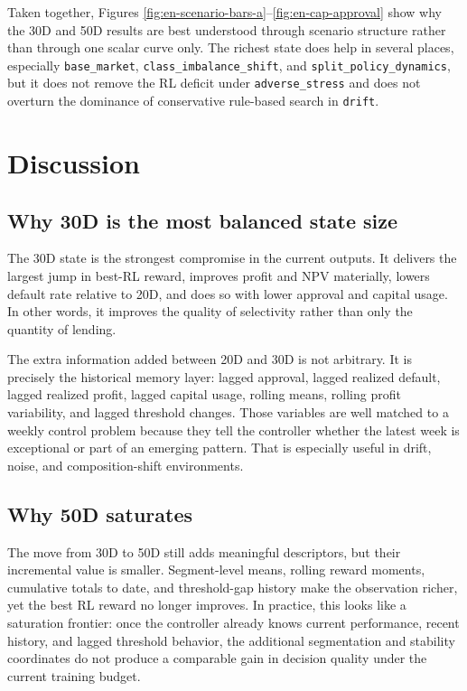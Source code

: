 \documentclass[12pt,a4paper]{article}
\begin{document}
Taken together, Figures \ref{fig:en-scenario-bars-a}--\ref{fig:en-cap-approval} show why the 30D and 50D results are best understood through scenario structure rather than through one scalar curve only. The richest state does help in several places, especially \texttt{base\_market}, \texttt{class\_imbalance\_shift}, and \texttt{split\_policy\_dynamics}, but it does not remove the RL deficit under \texttt{adverse\_stress} and does not overturn the dominance of conservative rule-based search in \texttt{drift}.

\section{Discussion}

\subsection{Why 30D is the most balanced state size}

The 30D state is the strongest compromise in the current outputs. It delivers the largest jump in best-RL reward, improves profit and NPV materially, lowers default rate relative to 20D, and does so with lower approval and capital usage. In other words, it improves the quality of selectivity rather than only the quantity of lending.

The extra information added between 20D and 30D is not arbitrary. It is precisely the historical memory layer: lagged approval, lagged realized default, lagged realized profit, lagged capital usage, rolling means, rolling profit variability, and lagged threshold changes. Those variables are well matched to a weekly control problem because they tell the controller whether the latest week is exceptional or part of an emerging pattern. That is especially useful in drift, noise, and composition-shift environments.

\subsection{Why 50D saturates}

The move from 30D to 50D still adds meaningful descriptors, but their incremental value is smaller. Segment-level means, rolling reward moments, cumulative totals to date, and threshold-gap history make the observation richer, yet the best RL reward no longer improves. In practice, this looks like a saturation frontier: once the controller already knows current performance, recent history, and lagged threshold behavior, the additional segmentation and stability coordinates do not produce a comparable gain in decision quality under the current training budget.
\end{document}
